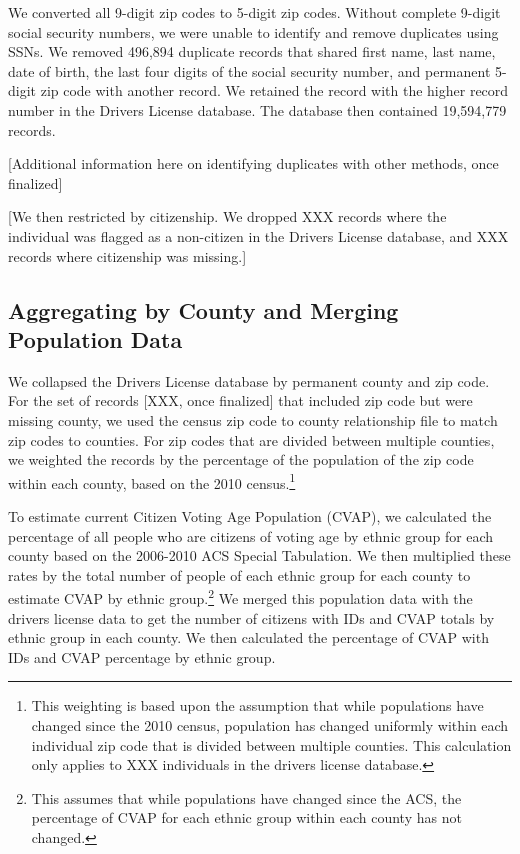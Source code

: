 \documentclass[12pt]{article}
\begin{document}
We converted all 9-digit zip codes to 5-digit zip codes.  Without complete 9-digit social security numbers, we were unable to identify and remove duplicates using SSNs.  We removed 496,894 duplicate records that shared first name, last name, date of birth, the last four digits of the social security number, and permanent 5-digit zip code with another record.  We retained the record with the higher record number in the Drivers License database.  The database then contained 19,594,779 records.

[Additional information here on identifying duplicates with other methods, once finalized]

[We then restricted by citizenship.  We dropped XXX records where the individual was flagged as a non-citizen in the Drivers License database, and XXX records where citizenship was missing.] 

\subsection{Aggregating by County and Merging Population Data}
We collapsed the Drivers License database by permanent county and zip
code.  For the set of records [XXX, once finalized] that included zip
code but were missing county, we used the census zip code to county
relationship file to match zip codes to counties.  For zip codes that
are divided between multiple counties, we weighted the records by the
percentage of the population of the zip code within each county, based
on the 2010 census.\footnote{This weighting is based upon the
  assumption that while populations have changed since the 2010
  census, population has changed uniformly within each individual zip
  code that is divided between multiple counties.  This calculation
  only applies to XXX individuals in the drivers license database.}

To estimate current Citizen Voting Age Population (CVAP), we
calculated the percentage of all people who are citizens of voting age
by ethnic group for each county based on the 2006-2010 ACS Special
Tabulation.  We then multiplied these rates by the total number of
people of each ethnic group for each county to estimate CVAP by ethnic
group.\footnote{This assumes that while populations have changed since
  the ACS, the percentage of CVAP for each ethnic group within each
  county has not changed.}  We merged this population data with the
drivers license data to get the number of citizens with IDs and CVAP
totals by ethnic group in each county.  We then calculated the
percentage of CVAP with IDs and CVAP percentage by ethnic group.
\end{document}
